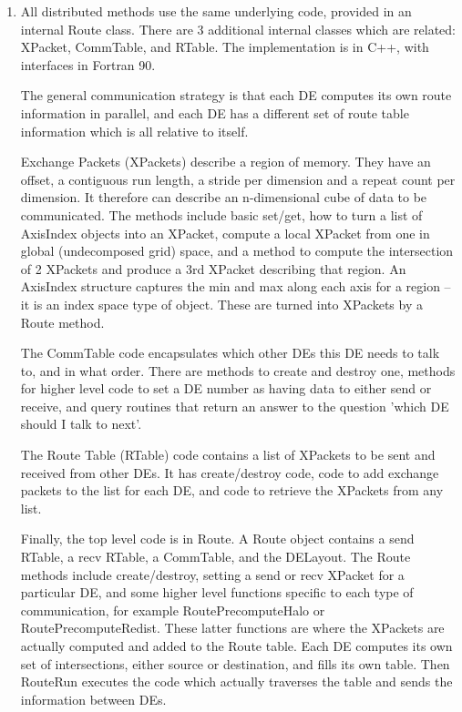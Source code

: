 \begin{enumerate}

\item

All distributed methods use the same underlying code, provided
in an internal Route class.  There are 3 additional internal
classes which are related: XPacket, CommTable, and RTable.
The implementation is in C++, with interfaces in Fortran 90.

The general communication strategy is that each
DE computes its own route information in parallel, and
each DE has a different set of route table information
which is all relative to itself.

Exchange Packets (XPackets)
describe a region of memory.  They have
an offset, a contiguous run length, a stride per dimension
and a repeat count per dimension.  It therefore can describe an
n-dimensional cube of data to be communicated.
The methods include basic set/get, how to turn
a list of AxisIndex objects into an XPacket, 
compute a local XPacket from one
in global (undecomposed grid) space, and a method to
compute the intersection
of 2 XPackets and produce a 3rd XPacket describing
that region.  An AxisIndex structure captures
the min and max along each axis for a region -- it is an
index space type of object.  These are  
turned into XPackets by a Route method.

The CommTable code encapsulates which other DEs this
DE needs to talk to, and in what order.  There are
methods to create and destroy one, methods for higher
level code to set a DE number as having data to either
send or receive, and query routines that return an answer
to the question 'which DE should I talk to next'.  

The Route Table (RTable) code contains a list of
XPackets to be sent and received from other DEs.
It has create/destroy code, code to add exchange
packets to the list for each DE, and code
to retrieve the XPackets from any list.

Finally, the top level code is in Route.  A Route
object contains a send RTable, a recv RTable,
a CommTable, and the DELayout.   
The Route methods
include create/destroy, setting a send or recv XPacket
for a particular DE,
and some higher level functions specific to each
type of communication, for example RoutePrecomputeHalo
or RoutePrecomputeRedist.  These latter functions
are where the XPackets are actually computed and added to
the Route table.  Each DE computes its own set of intersections,
either source or destination, and fills its own table.
Then RouteRun executes the code which actually traverses
the table and sends the information between DEs.

\end{enumerate}

\newpage






